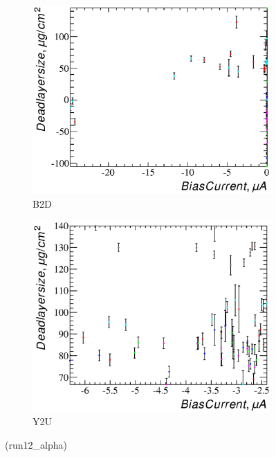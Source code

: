 \documentclass[a4paper,12pt]{article}
\begin{document}
\begin{figure}[htb]
\begin{subfigure}[t]{0.49\textwidth}
\includegraphics[width=\textwidth]{gfx/run12_alpha/B2D/c_hBiasCurrent_DeadLayerSize.eps}
\caption{B2D}
\end{subfigure}
%
\hfill
%
\begin{subfigure}[t]{0.49\textwidth}
\includegraphics[width=\textwidth]{gfx/run12_alpha/Y2U/c_hBiasCurrent_DeadLayerSize.eps}
\caption{Y2U}
\end{subfigure}
\caption{\bcvsxdllabel{} (run12\_alpha)}
\end{figure}
\end{document}
